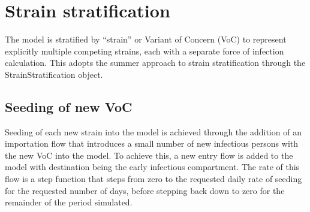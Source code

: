 \section{Strain stratification} \label{strain}
The model is stratified by ``strain'' or Variant of Concern (VoC)
to represent explicitly multiple competing strains, each with a separate force of infection calculation.
This adopts the summer approach to strain stratification through the StrainStratification object.

\subsection{Seeding of new VoC}
Seeding of each new strain into the model is achieved through the addition of an importation flow
that introduces a small number of new infectious persons with the new VoC into the model.
To achieve this, a new entry flow is added to the model with destination being the early infectious compartment.
The rate of this flow is a step function that steps from zero to the requested daily rate of seeding for the requested number of days,
before stepping back down to zero for the remainder of the period simulated.